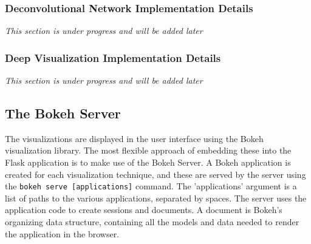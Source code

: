 \subsubsection{Deconvolutional Network Implementation Details}

\textit{This section is under progress and will be added later}

\subsubsection{Deep Visualization Implementation Details}

\textit{This section is under progress and will be added later}

\subsection{The Bokeh Server}

The visualizations are displayed in the user interface using the Bokeh visualization library. The most flexible approach of embedding these into the Flask application is to make use of the Bokeh Server. A Bokeh application is created for each visualization technique, and these are served by the server using the \texttt{bokeh serve [applications]} command. The 'applications' argument is a list of paths to the various applications, separated by spaces. The server uses the application code to create sessions and documents. A document is Bokeh's organizing data structure, containing all the models and data needed to render the application in the browser.\\

